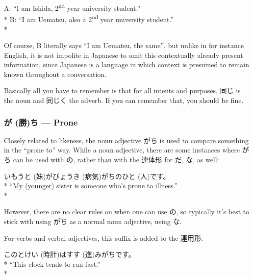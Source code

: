 \documentclass[11pt, b5paper, twoside, openright, onecolumn]{book}
\makeatletter
\newcommand*{\rubystack}[2]{{\relscale{0.5}%
  \begin{tabular}[b]{@{}c@{}}%
    {#1}\\%
   {\textscale{2}{#2}}%
  \end{tabular}}%
}
\DeclareRobustCommand*{\ruby}[2]{%
  \mbox{%
    \setlength{\parskip}{0ex}%
    \BeginAccSupp{method=pdfstringdef,ActualText={#1}}%
      \rubystack{\phantom{#2}}{#1}%
      \llap{%
        \rubystack{#2}{\phantom{#1}}%
      }%
    \EndAccSupp{}%
  }%
}
\renewcommand*{\ruby}[2]{#2 (#1)}%
\newenvironment{exampleblock}{
\setlength{\parindent}{0.6in}
\begin{minipage}[t]{\dimexpr\textwidth-\parindent}}
{\end{minipage}}
\makeatother
\begin{document}
\begin{exampleblock}
A: “I am Ishida‚ 2\textsuperscript{nd} year university student.” \\* 
B: “I am Uematsu‚ also a 2\textsuperscript{nd} year university student.” \\* 
\end{exampleblock}
\vspace{0.2cm}

Of course‚ B literally says “I am Uematsu‚ the same”‚ but unlike in for instance English‚ it is not impolite in Japanese to omit this contextually already present information‚ since Japanese is a language in which context is presumed to remain known throughout a conversation.

Basically all you have to remember is that for all intents and purposes‚ 同じ is the noun and 同じく the adverb. If you can remember that‚ you should be fine.

\subsubsection{\ruby{勝}{が}ち — Prone}

Closely related to likeness‚ the noun adjective がち is used to compare something in the “prone to” way. While a noun adjective‚ there are some instances where がち can be used with の‚ rather than with the 連体形 for だ‚ な‚ as well:

\vspace{0.4cm}
\begin{exampleblock}
\ruby{妹}{いもうと}が\ruby{病気}{びょうき}がちの\ruby{人}{ひと}です。 \\* 
“My (younger) sister is someone who’s prone to illness.” \\* 
\end{exampleblock}
\vspace{0.2cm}

However‚ there are no clear rules on when one can use の‚ so typically it’s best to stick with using がち as a normal noun adjective‚ using な.

For verbs and verbal adjectives‚ this suffix is added to the 連用形:

\vspace{0.4cm}
\begin{exampleblock}
この\ruby{時計}{とけい}は\ruby{進}{すす}みがちです。 \\* 
“This clock tends to run fast.” \\* 
\end{exampleblock}
\end{document}
